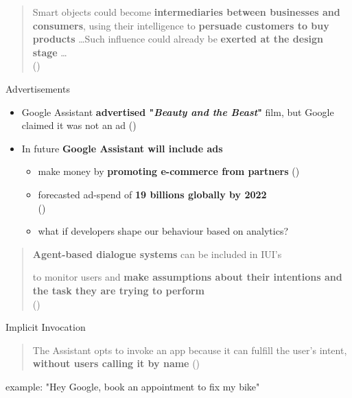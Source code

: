 \documentclass{beamer}
\begin{document}
\begin{frame}[allowframebreaks]
\begin{quote}
Smart objects could become \textbf{intermediaries between businesses and consumers}, using their intelligence to \textbf{persuade customers to buy products} \dots Such influence could already be \textbf{exerted at the design stage} \dots\\(\cite{brey2005freedom})
\end{quote}

\begin{block}{Advertisements}
	\begin{itemize}
		\item Google Assistant \textbf{advertised "\emph{Beauty and the Beast}"} film, but Google claimed it was not an ad (\cite{androidPolice})
		\medskip
		\item In future \textbf{Google Assistant will include ads}
			\begin{itemize}
				\item make money by \textbf{promoting e-commerce from partners} (\cite{recode})
				\smallskip
				\item forecasted ad-spend of \textbf{19 billions globally by 2022}
				\\(\cite{juniper})
				\smallskip
				\item what if developers shape our behaviour based on analytics?
			\end{itemize}
	\end{itemize}
\end{block}

\framebreak

\begin{quote}
	\textbf{Agent-based dialogue systems} can be included in IUI’s

	to monitor users and \textbf{make assumptions about their intentions and the task they are trying to perform} \\(\cite{brey2005freedom})
\end{quote}
\medskip

\begin{block}{Implicit Invocation}
\begin{quote}
The Assistant opts to invoke an app because it can fulfill the user's intent, \textbf{without users calling it by name} (\cite{googleactions})
\end{quote}

\bigskip
example: "Hey Google, book an appointment to fix my bike"
\end{block}
\end{frame}
\end{document}

